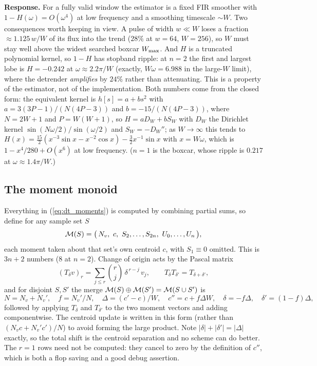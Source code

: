 \documentclass{article}
\numberwithin{equation}{section}   %
\begin{document}
{\bf Response.}  For a fully valid window the estimator is a fixed FIR smoother with
$1 - H(\omega) = O(\omega^{4})$ at low frequency and a smoothing timescale $\sim W$.  Two consequences worth
keeping in view.  A pulse of width $w \ll W$ loses a fraction $\approx 1.125\,w/W$ of its flux into the trend
($28\%$ at $w = 64$, $W = 256$), so $W$ must stay well above the widest searched boxcar $W_{\rm max}$.  And $H$ is a
truncated polynomial kernel, so $1-H$ has stopband ripple: at $n=2$ the first and largest lobe is
$H = -0.242$ at $\omega \approx 2.2\pi/W$ (exactly, $W\omega = 6.988$ in the large-$W$ limit), where the
detrender {\em amplifies} by $24\%$ rather than attenuating.  This is a property of the estimator, not of the
implementation.  Both numbers come from the closed form: the equivalent kernel is $h[s] = a + bs^2$ with
$a = 3(3P-1)/(N(4P-3))$ and $b = -15/(N(4P-3))$, where $N = 2W+1$ and $P = W(W+1)$, so
$H = a D_W + b S_W$ with $D_W$ the Dirichlet kernel $\sin(N\omega/2)/\sin(\omega/2)$ and
$S_W = -D_W''$; as $W \rightarrow \infty$ this tends to
$H(x) = \frac{15}{2}(x^{-3}\sin x - x^{-2}\cos x) - \frac{3}{2}x^{-1}\sin x$ with $x = W\omega$, which is
$1 - x^4/280 + O(x^6)$ at low frequency.  ($n=1$ is the boxcar, whose ripple is $0.217$ at
$\omega \approx 1.4\pi/W$.)

\subsection{The moment monoid}
\label{sec:dt_monoid}

Everything in (\ref{eq:dt_moments}) is computed by combining partial sums, so define for any sample set $S$
\begin{equation}
{\cal M}(S) = \big(\, N_v,\ c,\ S_2, \ldots, S_{2n},\ U_0, \ldots, U_n \,\big),
\end{equation}
each moment taken about that set's own centroid $c$, with $S_1 \equiv 0$ omitted.  This is $3n+2$ numbers
($8$ at $n=2$).  Change of origin acts by the Pascal matrix
\begin{equation}
(T_\delta v)_r = \sum_{j \le r} \binom{r}{j}\, \delta^{\,r-j}\, v_j ,
\qquad
T_\delta T_{\delta'} = T_{\delta + \delta'} ,
\label{eq:dt_shift}
\end{equation}
and for disjoint $S, S'$ the merge ${\cal M}(S) \oplus {\cal M}(S') = {\cal M}(S \cup S')$ is
\begin{equation}
N = N_v + N_v',
\quad
f = N_v'/N,
\quad
\Delta = (c' - c)/W,
\quad
c'' = c + f\Delta W,
\quad
\delta = -f\Delta,
\quad
\delta' = (1-f)\Delta ,
\label{eq:dt_merge}
\end{equation}
followed by applying $T_\delta$ and $T_{\delta'}$ to the two moment vectors and adding componentwise.
The centroid update is written in this form (rather than $(N_v c + N_v' c')/N$) to avoid forming the large
product.  Note $|\delta| + |\delta'| = |\Delta|$ exactly, so the total shift is the centroid separation and no
scheme can do better.  The $r=1$ rows need not be computed: they cancel to zero by the definition of $c''$,
which is both a flop saving and a good debug assertion.
\end{document}
